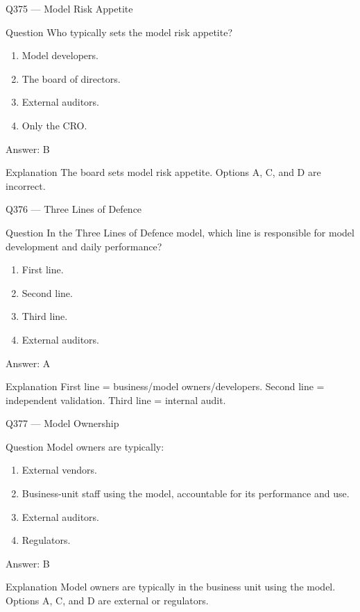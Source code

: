 \documentclass[aspectratio=169,8pt]{beamer}
\begin{document}
	\begin{frame}{Q375 --- Model Risk Appetite}
		\begin{block}{Question}
			Who typically sets the model risk appetite?
			\begin{enumerate}
				\item Model developers.
				\item The board of directors.
				\item External auditors.
				\item Only the CRO.
			\end{enumerate}
		\end{block}
		\begin{exampleblock}{Answer: B}\end{exampleblock}
		\begin{block}{Explanation}
			The board sets model risk appetite. Options A, C, and D are incorrect.
		\end{block}
	\end{frame}
	
	\begin{frame}{Q376 --- Three Lines of Defence}
		\begin{block}{Question}
			In the Three Lines of Defence model, which line is responsible for model development and daily performance?
			\begin{enumerate}
				\item First line.
				\item Second line.
				\item Third line.
				\item External auditors.
			\end{enumerate}
		\end{block}
		\begin{exampleblock}{Answer: A}\end{exampleblock}
		\begin{block}{Explanation}
			First line = business/model owners/developers. Second line = independent validation. Third line = internal audit.
		\end{block}
	\end{frame}
	
	\begin{frame}{Q377 --- Model Ownership}
		\begin{block}{Question}
			Model owners are typically:
			\begin{enumerate}
				\item External vendors.
				\item Business-unit staff using the model, accountable for its performance and use.
				\item External auditors.
				\item Regulators.
			\end{enumerate}
		\end{block}
		\begin{exampleblock}{Answer: B}\end{exampleblock}
		\begin{block}{Explanation}
			Model owners are typically in the business unit using the model. Options A, C, and D are external or regulators.
		\end{block}
	\end{frame}
	
\end{document}
